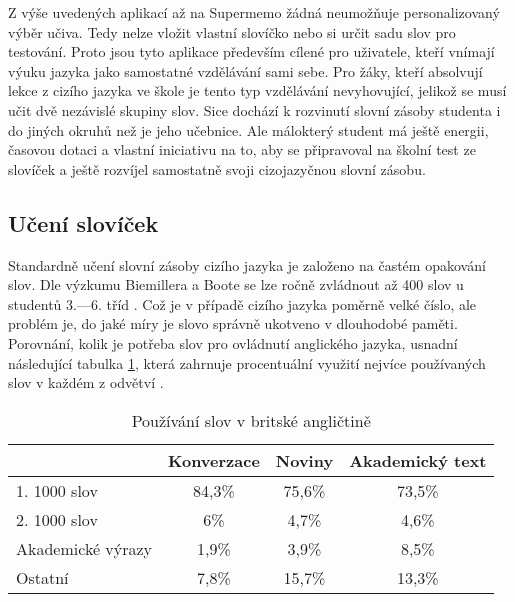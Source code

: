 \documentclass[a4paper,11pt,titlepage,fleqn]{article}
\begin{document}


        Z výše uvedených aplikací až na Supermemo žádná neumožňuje personalizovaný výběr učiva. Tedy nelze vložit vlastní slovíčko nebo si určit sadu slov pro testování. Proto jsou tyto aplikace především cílené pro uživatele, kteří vnímají výuku jazyka jako samostatné vzdělávání sami sebe. Pro žáky, kteří absolvují lekce z cizího jazyka ve škole je tento typ vzdělávání nevyhovující, jelikož se musí učit dvě nezávislé skupiny slov. Sice dochází k rozvinutí slovní zásoby studenta i do jiných okruhů než je jeho učebnice. Ale málokterý student má ještě energii, časovou dotaci a vlastní iniciativu na to, aby se připravoval na školní test ze slovíček a ještě rozvíjel samostatně svoji cizojazyčnou slovní zásobu.

    \subsection{Učení slovíček}
        Standardně učení slovní zásoby cizího jazyka je založeno na častém opakování slov. Dle výzkumu Biemillera a Boote se lze ročně zvládnout až 400 slov u studentů 3.—6. tříd \cite{bib:beimiller}. Což je v případě cizího jazyka poměrně velké číslo, ale problém je, do jaké míry je slovo správně ukotveno v dlouhodobé paměti. Porovnání, kolik je potřeba slov pro ovládnutí anglického jazyka, usnadní následující tabulka \ref{tab:english-vocab-usage}, která zahrnuje procentuální využití nejvíce používaných slov v každém z odvětví \cite{bib:learning-vocab}. 

        \begin{table}[ht!]
            \centering
            \begin{tabular}{|l|c|c|c|}
            \hline
            & \multicolumn{1}{l|}{Konverzace} & \multicolumn{1}{l|}{Noviny} & \multicolumn{1}{l|}{Akademický text} \\ \hline
            1. 1000 slov & 84,3\% & 75,6\% & 73,5\% \\ \hline
            2. 1000 slov & 6\% & 4,7\% & 4,6\% \\ \hline
            Akademické výrazy& 1,9\% & 3,9\% & 8,5\% \\ \hline
            Ostatní & 7,8\% & 15,7\% & 13,3\% \\ \hline
            \end{tabular}
            \caption{Používání slov v britské angličtině}
            \label{tab:english-vocab-usage}
        \end{table}
\end{document}
